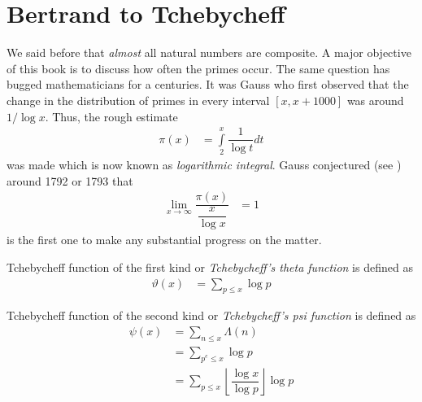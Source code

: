 \documentclass[elemannt.tex]{subfile}
\begin{document}
	\chapter{Bertrand to Tchebycheff}
	We said before that \textit{almost} all natural numbers are composite. A major objective of this book is to discuss how often the primes occur. The same question has bugged mathematicians for a centuries. It was Gauss who first observed that the change in the distribution of primes in every interval $[x,x+1000]$ was around $1/\log{x}$. Thus, the rough estimate
		\begin{align*}
			\pi(x)
				& = \int\limits_{2}^{x}\dfrac{1}{\log{t}}dt
		\end{align*}
	was made which is now known as \textit{logarithmic integral}. Gauss conjectured (see \textcite[Page 37]{landau_1911}) around 1792 or 1793 that
		\begin{align*}
			\lim\limits_{x\to\infty}\dfrac{\pi(x)}{\dfrac{x}{\log{x}}}
				& = 1
		\end{align*}
	\textcite{tchebycheff_1852} is the first one to make any substantial progress on the matter.
		\begin{definition}
			Tchebycheff function of the first kind or \textit{Tchebycheff's theta function} is defined as
				\begin{align*}
					\vartheta(x)
						& = \sum_{p\leq x}\log{p}
				\end{align*}
		\end{definition}

		\begin{definition}
			Tchebycheff function of the second kind or \textit{Tchebycheff's psi function} is defined as
				\begin{align*}
					\psi(x)
						& = \sum_{n\leq x}\Lambda(n)\\
						& = \sum_{p^{e}\leq x}\log{p}\\
						& = \sum_{p\leq x}\left\lfloor{\dfrac{\log{x}}{\log{p}}}\right\rfloor \log{p}
				\end{align*}
		\end{definition}
\end{document}
